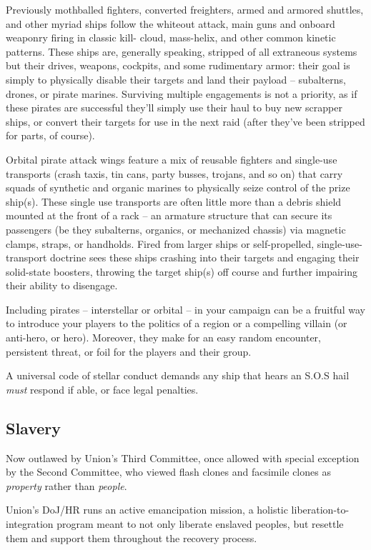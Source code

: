 Previously mothballed fighters, converted freighters, armed and armored shuttles, and other
myriad ships follow the whiteout attack, main guns and onboard weaponry firing in classic kill-
cloud, mass-helix, and other common kinetic patterns. These ships are, generally speaking,
stripped of all extraneous systems but their drives, weapons, cockpits, and some rudimentary
armor: their goal is simply to physically disable their targets and land their payload -- subalterns,
drones, or pirate marines. Surviving multiple engagements is not a priority, as if these pirates are
successful they'll simply use their haul to buy new scrapper ships, or convert their targets for use
in the next raid (after they've been stripped for parts, of course).

Orbital pirate attack wings feature a mix of reusable fighters and single-use transports (crash
taxis, tin cans, party busses, trojans, and so on) that carry squads of synthetic and organic
marines to physically seize control of the prize ship(s). These single use transports are often little
more than a debris shield mounted at the front of a rack -- an armature structure that can secure
its passengers (be they subalterns, organics, or mechanized chassis) via magnetic clamps,
straps, or handholds. Fired from larger ships or self-propelled, single-use-transport doctrine sees
these ships crashing into their targets and engaging their solid-state boosters, throwing the target
ship(s) off course and further impairing their ability to disengage.

Including pirates -- interstellar or orbital -- in your campaign can be a fruitful way to introduce your
players to the politics of a region or a compelling villain (or anti-hero, or hero). Moreover, they
make for an easy random encounter, persistent threat, or foil for the players and their group.

A universal code of stellar conduct demands any ship that hears an S.O.S hail \textit{must} respond if
able, or face legal penalties.

\subsection{Slavery}

Now outlawed by Union's Third Committee, once allowed with special exception by the Second
Committee, who viewed flash clones and facsimile clones as \textit{property} rather than \textit{people}.

Union's DoJ/HR runs an active emancipation mission, a holistic liberation-to-integration program
meant to not only liberate enslaved peoples, but resettle them and support them throughout the
recovery process.

